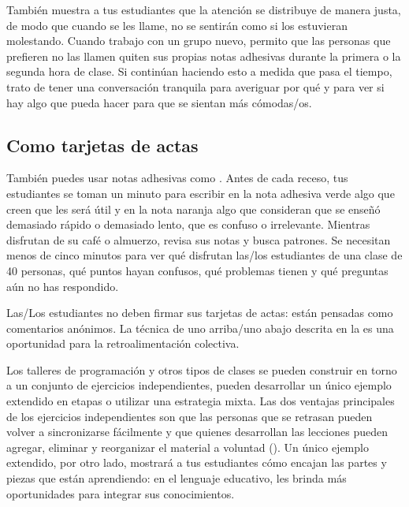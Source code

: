 También muestra a tus estudiantes que la atención se distribuye de manera justa,
de modo que cuando se les llame,
no se sentirán como si los estuvieran molestando.
Cuando trabajo con un grupo nuevo,
permito que las personas que prefieren no las llamen quiten sus propias notas adhesivas
durante la primera o la segunda hora de clase.
Si continúan haciendo esto a medida que pasa el tiempo,
trato de tener una conversación tranquila para averiguar por qué
y para ver si hay algo que pueda hacer para que se sientan más cómodas/os.

\subsection*{Como tarjetas de actas}

También puedes usar notas adhesivas como .
Antes de cada receso,
tus estudiantes se toman un minuto para escribir en la nota adhesiva verde
algo que creen que les será útil
y en la nota naranja
algo que consideran que se enseñó demasiado rápido o demasiado lento,
que es confuso
o irrelevante.
Mientras disfrutan de su café o almuerzo,
revisa sus notas y busca patrones.
Se necesitan menos de cinco minutos para ver qué disfrutan las/los estudiantes de una clase de 40 personas,
qué puntos hayan confusos,
qué problemas tienen
y qué preguntas aún no has respondido.

Las/Los estudiantes no deben firmar sus tarjetas de actas:
están pensadas como comentarios anónimos.
La técnica de uno arriba/uno abajo descrita en la 
es una oportunidad para la retroalimentación colectiva.


Los talleres de programación y otros tipos de clases
se pueden construir en torno a un conjunto de ejercicios independientes,
pueden desarrollar un único ejemplo extendido en etapas
o utilizar una estrategia mixta.
Las dos ventajas principales de los ejercicios independientes son que
las personas que se retrasan pueden volver a sincronizarse fácilmente
y que quienes desarrollan las lecciones pueden agregar, eliminar y reorganizar el material a voluntad
().
Un único ejemplo extendido,
por otro lado,
mostrará a tus estudiantes cómo encajan las partes y piezas que están aprendiendo:
en el lenguaje educativo,
les brinda más oportunidades para integrar sus conocimientos.

